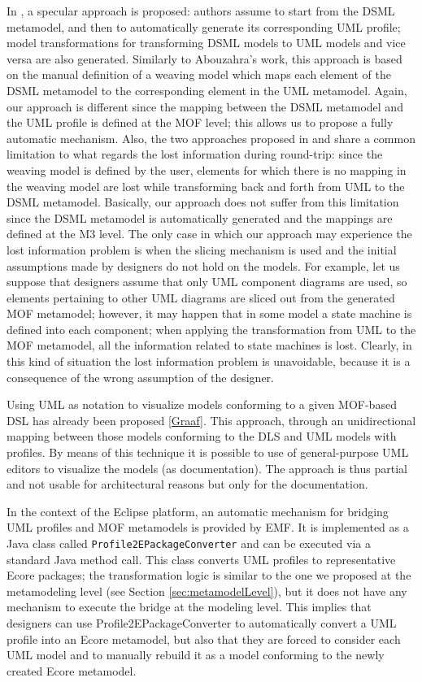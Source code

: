 In \cite{Wimmer}, a specular approach is proposed: authors assume to start from the DSML metamodel, and then to automatically
generate its corresponding UML profile; model transformations for transforming DSML models
to UML models and vice versa are also generated. Similarly to Abouzahra's work, this approach is based on the manual definition of a weaving model which maps
each element of the DSML metamodel to the corresponding element in the UML metamodel.
Again, our approach is different since the mapping between the DSML metamodel and the UML profile is defined at the MOF level; this
allows us to propose a fully automatic mechanism. Also, the two approaches proposed in \cite{Abouzahra} and \cite{Wimmer} share a common
limitation to what regards the lost information during round-trip: since the weaving model is defined by the user, 
elements for which there is no mapping in the weaving model are lost while transforming back and forth from UML to the DSML metamodel. 
Basically, our approach does not suffer from this limitation since the DSML metamodel is automatically generated and the mappings are defined at the M3 level. The only case in which our approach may experience the lost information problem is when the slicing mechanism is used and the initial assumptions made by designers do not hold on the models. For example, let us suppose that designers assume that only UML component diagrams
are used, so elements pertaining to other UML diagrams are sliced out from the generated MOF metamodel; however, it may happen that in some model a state machine is defined into each component; when applying the transformation from UML to the MOF metamodel, all the information
related to state machines is lost. Clearly, in this kind of situation the lost information problem is unavoidable, because it is a consequence of the wrong assumption of the designer.

Using UML as notation to visualize models conforming to a given MOF-based DSL has already been proposed \ref{Graaf}.
This approach, through an unidirectional mapping between those models conforming to the DLS and UML models with profiles. By means of this technique it is possible to use of general-purpose UML editors to visualize the models (as documentation). The approach is thus partial and not usable for architectural reasons but only for the documentation.

In the context of the Eclipse platform, an automatic mechanism for bridging UML profiles and MOF metamodels is provided by EMF.
It is implemented as a Java class called \texttt{Profile2EPackageConverter} and  can be executed via a standard Java method call. 
This class converts UML profiles to representative Ecore packages; the transformation logic is similar to the one we proposed at the metamodeling
level (see Section \ref{sec:metamodelLevel}), but it does not have any mechanism to execute the bridge at the modeling level. This implies that
designers can use Profile2EPackageConverter to automatically convert a UML profile into an Ecore metamodel, but also that they are forced to consider each UML model and to manually rebuild it as a model conforming to the newly created Ecore metamodel.
